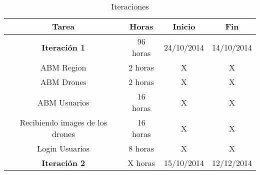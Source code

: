 \begin{table}[ht]
\caption{Iteraciones}
\centering 
\begin{tabular}{c c c c}
\hline\hline 
Tarea              & Horas & Inicio & Fin\\
\hline	
\textbf{Iteraci\'on 1} & 96 horas & 24/10/2014 & 14/10/2014  \\
ABM Region & 2 horas & X & X \\
ABM Drones & 2 horas & X & X \\
ABM Usuarios & 16 horas & X & X \\
Recibiendo images de los drones & 16 horas & X & X \\
Login Usuarios & 8 horas & X & X \\
\textbf{Iteraci\'on 2} & X horas & 15/10/2014 & 12/12/2014  \\





\end{tabular}
\end{table}
